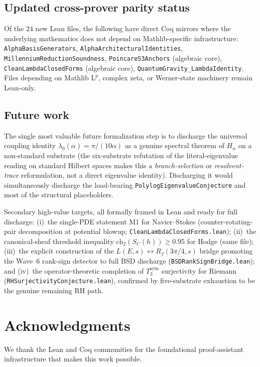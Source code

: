 \documentclass[11pt,a4paper]{article}
\theoremstyle{definition}
\begin{document}
\subsection{Updated cross-prover parity status}

Of the $24$ new Lean files, the following have direct Coq mirrors
where the underlying mathematics does not depend on Mathlib-specific
infrastructure: \texttt{AlphaBasisGenerators},
\texttt{AlphaArchitecturalIdentities},
\texttt{MillenniumReductionSoundness}, \texttt{PoincareS3Anchors}
(algebraic core), \texttt{CleanLambdaClosedForms} (algebraic core),
\texttt{QuantumGravity\_LambdaIdentity}. Files depending on Mathlib
$\mathrm{L}^p$, complex zeta, or Werner-state machinery remain Lean-only.

\subsection{Future work}

The single most valuable future formalization step is to discharge
the universal coupling identity $\lambda_0(\alpha) = \pi/(10\alpha)$
as a genuine spectral theorem of $H_\alpha$ on a non-standard substrate
(the six-substrate refutation of the literal-eigenvalue reading on
standard Hilbert spaces makes this a \emph{branch-selection} or
\emph{resolvent-trace} reformulation, not a direct eigenvalue identity).
Discharging it would simultaneously discharge the load-bearing
\texttt{PolylogEigenvalueConjecture} and most of the structural
placeholders.

Secondary high-value targets, all formally framed in Lean and ready
for full discharge: (i)~the single-PDE statement M1 for Navier--Stokes
(counter-rotating-pair decomposition at potential blowup;
\texttt{CleanLambdaClosedForms.lean}); (ii)~the canonical-sheaf
threshold inequality $\mathrm{ch}_2(S_C(h)) \geq 0.95$ for Hodge
(same file); (iii)~the explicit construction of the $L(E,s)
\leftrightarrow R_f(3\pi/4, s)$ bridge promoting the Wave~6 rank-sign
detector to full BSD discharge (\texttt{BSDRankSignBridge.lean}); and
(iv)~the operator-theoretic completion of $T_3^{\mathrm{sym}}$
surjectivity for Riemann (\texttt{RHSurjectivityConjecture.lean}),
confirmed by five-substrate exhaustion to be the genuine remaining
RH path.

\section*{Acknowledgments}
We thank the Lean and Coq communities for the foundational
proof-assistant infrastructure that makes this work possible.
\end{document}
